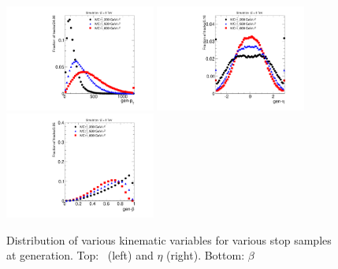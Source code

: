 \begin{figure}
 \begin{center}
  \includegraphics[clip=true, trim=0.0cm 0cm 1.4cm 0cm, width=0.44\textwidth]{figures/muonly/Selection_Comp_Stop_genpT}
  \includegraphics[clip=true, trim=0.0cm 0cm 1.4cm 0cm, width=0.44\textwidth]{figures/muonly/Selection_Comp_Stop_geneta}
  \includegraphics[clip=true, trim=0.0cm 0cm 1.4cm 0cm, width=0.44\textwidth]{figures/muonly/Selection_Comp_Stop_genbeta}
 \end{center}
 \caption[Distribution of \pt, $\eta$, and $\beta$ for various stop samples at generation]
{Distribution of various kinematic variables for various stop samples at generation.
Top: \pt\ (left) and $\eta$ (right).
Bottom: $\beta$
   \label{fig:GenStop}}
\end{figure}


